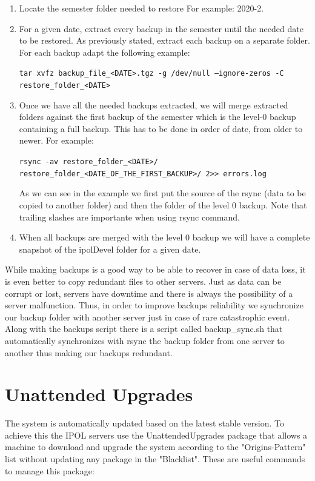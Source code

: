 \documentclass[a4paper,12pt]{article}
\begin{document}
\begin{enumerate}
  \item Locate the semester folder needed to restore For example: 2020-2.
  \item For a given date, extract every backup in the semester until the needed date to be restored. As previously stated, extract each backup on a separate folder. For each backup adapt the following example:

  {\tt tar xvfz backup\_file\_<DATE>.tgz -g /dev/null --ignore-zeros -C restore\_folder\_<DATE>}
  \item Once we have all the needed backups extracted, we will merge extracted folders against the first backup of the semester which is the level-0 backup containing a full backup. This has to be done in order of date, from older to newer. For example:
  
  {\tt rsync -av restore\_folder\_<DATE>/ restore\_folder\_<DATE\_OF\_THE\_FIRST\_BACKUP>/ 2>> errors.log}

  As we can see in the example we first put the source of the rsync (data to be copied to another folder) and then the folder of the level 0 backup. Note that trailing slashes are importante when using rsync command.
  \item When all backups are merged with the level 0 backup we will have a complete snapshot of the ipolDevel folder for a given date.
\end{enumerate}

While making backups is a good way to be able to recover in case of data loss, it is even better to copy redundant files to other servers. Just as data can be corrupt or lost, servers have downtime and there is always the possibility of a server malfunction. Thus, in order to improve backups reliability we synchronize our backup folder with another server just in case of rare catastrophic event. Along with the backups script there is a script called backup\_sync.sh that automatically synchronizes with rsync the backup folder from one server to another thus making our backups redundant.


\section{Unattended Upgrades}

The system is automatically updated based on the latest stable version. To achieve this the IPOL servers use the UnattendedUpgrades package that allows a machine to download and upgrade the system according to the "Origins-Pattern" list without updating any package in the "Blacklist". These are useful commands to manage this package: 
\end{document}
